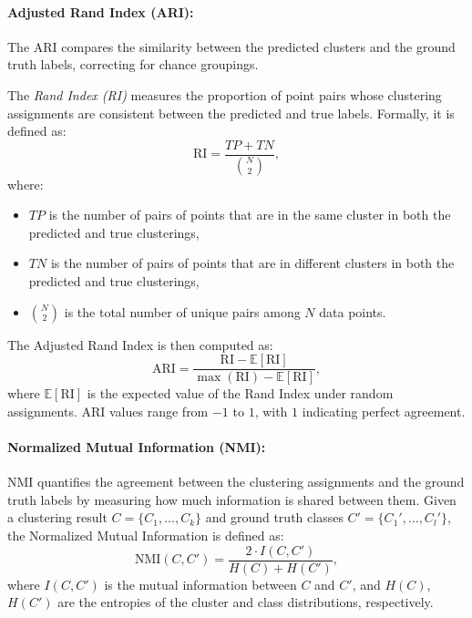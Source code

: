 \paragraph{Adjusted Rand Index (ARI):} The ARI compares the similarity between the predicted clusters and the ground
truth labels, correcting for chance groupings.

The \emph{Rand Index (RI)} measures the proportion of point pairs whose
clustering assignments are consistent between the predicted and true labels.
Formally, it is defined as:
\begin{equation}
    \text{RI} = \frac{TP + TN}{\binom{N}{2}},
\end{equation}
where:
\begin{itemize}
    \item $TP$ is the number of pairs of points that are in the same cluster in both the predicted and true clusterings,
    \item $TN$ is the number of pairs of points that are in different clusters in both the predicted and true clusterings,
    \item $\binom{N}{2}$ is the total number of unique pairs among $N$ data points.
\end{itemize}

The Adjusted Rand Index is then computed as:
\begin{equation}
    \text{ARI} = \frac{\text{RI} - \mathbb{E}[\text{RI}]}{\max(\text{RI}) - \mathbb{E}[\text{RI}]},
\end{equation}
where $\mathbb{E}[\text{RI}]$ is the expected value of the Rand Index under random assignments. ARI values range from $-1$ to $1$, with $1$ indicating perfect agreement.

\paragraph{Normalized Mutual Information (NMI):} NMI quantifies the agreement between the clustering assignments and the ground
truth labels by measuring how much information is shared between them. Given a
clustering result $ C = \{C_1, \dots, C_k\} $ and ground truth classes $ C' =
    \{C_1', \dots, C_l'\} $, the Normalized Mutual Information is defined as:
\begin{equation}
    \text{NMI}(C, C') = \frac{2 \cdot I(C, C')}{H(C) + H(C')},
\end{equation}
where $ I(C, C') $ is the mutual information between $ C $ and $ C' $, and $ H(C) $, $ H(C') $ are the entropies of the cluster and class distributions, respectively.

